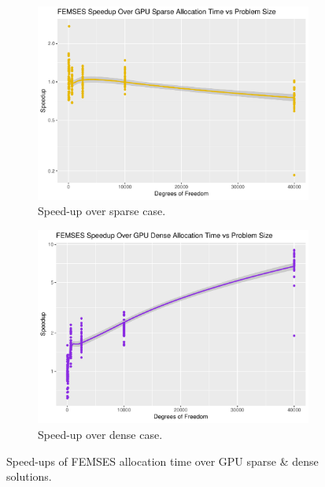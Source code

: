 \begin{figure}
	\centering
	\begin{subfigure}{0.48\linewidth}
		\centering
		\includegraphics[width =\linewidth]{Plots/alloc_femses_sparse_speedup_vs_n}
		\caption{Speed-up over sparse case.}
		\label{fig:alloc_femses_sparse}
	\end{subfigure}\hfill
	\begin{subfigure}{0.48\linewidth}
		\centering
		\includegraphics[width=\linewidth]{Plots/alloc_femses_dense_speedup_vs_n}
		\caption{Speed-up over dense case.}
		\label{fig:alloc_femses_dense}
	\end{subfigure}
	\caption{Speed-ups of FEMSES allocation time over GPU sparse \& dense solutions.}
	\label{fig:alloc_femses_su}
\end{figure}

